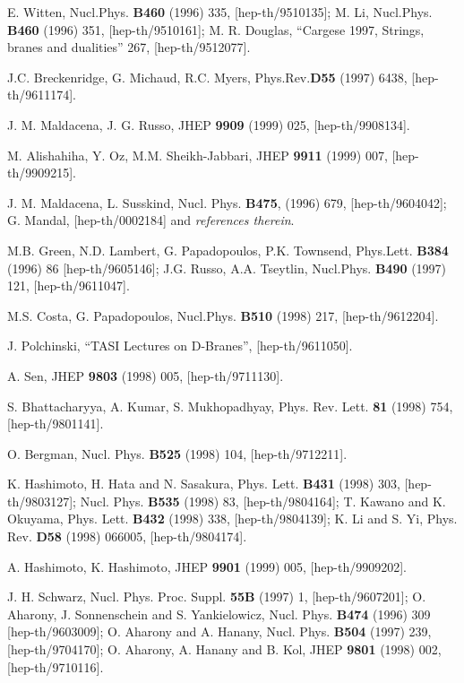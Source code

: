 \documentclass[a4paper,12pt]{article}
\begin{document}
\begin{thebibliography}{99}

 E. Witten,  Nucl.Phys. {\bf B460} (1996) 335,   
 [hep-th/9510135];
M. Li, Nucl.Phys. {\bf B460} (1996) 351, [hep-th/9510161]; 
M. R. Douglas, ``Cargese 1997, Strings, 
branes and dualities'' 267, [hep-th/9512077].

 J.C. Breckenridge, G. Michaud, R.C. Myers,
 Phys.Rev.{\bf D55} (1997) 6438, [hep-th/9611174].

 J. M. Maldacena, J. G. Russo, JHEP {\bf 9909} (1999)
  025, [hep-th/9908134].

 M. Alishahiha, Y. Oz, M.M. Sheikh-Jabbari, JHEP {\bf
    9911} (1999) 007, [hep-th/9909215].
 
 J. M. Maldacena, L. Susskind, Nucl. Phys. {\bf
 B475}, (1996) 679, [hep-th/9604042];
G. Mandal, [hep-th/0002184] and {\it references therein}.

 M.B. Green, N.D. Lambert, G. Papadopoulos,
P.K. Townsend, Phys.Lett. {\bf B384} (1996) 86 [hep-th/9605146]; 
J.G. Russo, A.A. Tseytlin, 
Nucl.Phys. {\bf B490} (1997) 121, [hep-th/9611047].

 M.S. Costa, G. Papadopoulos, Nucl.Phys. {\bf B510}
(1998) 217, [hep-th/9612204]. 


 J. Polchinski, ``TASI Lectures on D-Branes'',
 [hep-th/9611050].

 A. Sen, JHEP {\bf 9803} (1998) 005, [hep-th/9711130].

 S. Bhattacharyya, A. Kumar, S. Mukhopadhyay, 
Phys. Rev. Lett. {\bf 81} (1998) 754, [hep-th/9801141].

 O. Bergman, Nucl. Phys. {\bf B525} (1998) 104, 
[hep-th/9712211]. 

 K. Hashimoto, H. Hata and N. Sasakura, Phys. Lett. 
{\bf B431} (1998) 303, [hep-th/9803127]; Nucl. Phys. {\bf B535} (1998) 83,
[hep-th/9804164]; T. Kawano and K. Okuyama, Phys. Lett. {\bf B432} (1998) 338,
[hep-th/9804139]; K. Li and S. Yi, Phys. Rev. {\bf D58} (1998) 066005, 
[hep-th/9804174].

 A. Hashimoto, K. Hashimoto, JHEP {\bf 9901} (1999)
  005, [hep-th/9909202].

 J. H. Schwarz, Nucl. Phys. Proc. Suppl. {\bf 55B} (1997)
1, [hep-th/9607201]; O. Aharony, J. Sonnenschein and S. Yankielowicz, 
Nucl. Phys. {\bf B474} (1996) 309 [hep-th/9603009]; 
O. Aharony and A. Hanany, Nucl. Phys. {\bf B504} (1997) 239,
[hep-th/9704170];
O. Aharony, A. Hanany and B. Kol, JHEP {\bf 9801} (1998) 002,
[hep-th/9710116].


\end{thebibliography}
\end{document}
